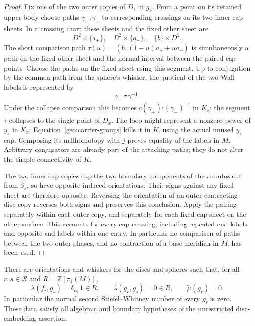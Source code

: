 \begin{proof}
Fix one of the two outer copies of $D_s$ in $g_s$.  From a point
on its retained upper body choose paths $\gamma_+,\gamma_-$
to corresponding crossings on its two inner cap sheets.  In a
crossing chart these sheets and the fixed other sheet are
\[
 D^2\times\{a_+\},\quad D^2\times\{a_-\},
                 \quad \{b\}\times D^2.
\]
The short comparison path
$\tau(u)=(b,(1-u)a_++u a_-)$ is simultaneously a path on the
fixed other sheet and the normal interval between the paired
cap points.  Choose the paths on the fixed sheet using this
segment.  Up to conjugation by the common path from the sphere's
whisker, the quotient of the two Wall labels is represented by
\[
                  \gamma_+\,\tau\,\gamma_-^{-1}.
\]
Under the collapse comparison this becomes
$c(\gamma_+)c(\gamma_-)^{-1}$ in $K_x$: the segment $\tau$
collapses to the single point of $D_x$.  The loop might represent
a nonzero power of $y_s$ in $K_x$; Equation~\eqref{geo:carrier-groups}
kills it in $K$, using the actual unused $y_s$ cap.  Composing
its nullhomotopy with $j$ proves equality of the labels in $M$.
Arbitrary conjugators are already part of the attaching paths;
they do not alter the simple connectivity of $K$.

The two inner cap copies cap the two boundary components of the
annulus cut from $S_s$, so have opposite induced orientations.
Their signs against any fixed sheet are therefore opposite.
Reversing the orientation of an outer contracting-disc copy
reverses both signs and preserves this conclusion.  Apply the
pairing separately within each outer copy, and separately for
each fixed cap sheet on the other surface.  This accounts for
every cap crossing, including repeated end labels and opposite
end labels within one entry.  In particular no comparison of
paths between the two outer phases, and no contraction of a
base meridian in $M$, has been used.
\end{proof}

\begin{corollary}\label{geo:input-invariants}
There are orientations and whiskers for the discs and spheres such
that, for all $r,s\in\mathcal R$ and
$R=\mathbb Z[\pi_1(M)]$,
\begin{equation}\label{geo:invariants}
 \lambda(f_r,g_s)=\delta_{rs}\,1\in R,
 \qquad \lambda(g_r,g_s)=0\in R,
 \qquad \widetilde\mu(g_r)=0.
\end{equation}
In particular the normal second Stiefel--Whitney number of every
$g_r$ is zero.  These data satisfy all algebraic and boundary
hypotheses of the unrestricted disc-embedding assertion.
\end{corollary}

